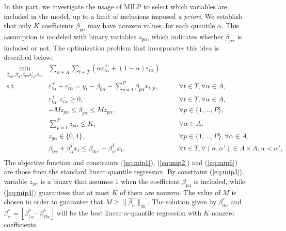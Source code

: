 In this part, we investigate the usage of MILP to select which variables are included in the model, up to a limit of inclusions imposed \textit{a priori}. We establish that only $K$ coefficients $\beta_{p\alpha}$ may have nonzero values, for each quantile $\alpha$. 
This assumption is modeled with binary variables $z_{p\alpha}$, which indicates whether $\beta_{p\alpha}$ is included or not.
The optimization problem that incorporates this idea is described below:
\begin{eqnarray}
 \underset{\beta_{0\alpha},\beta_\alpha,z_{p \alpha} \varepsilon_{t \alpha}^{+},\varepsilon_{t \alpha}^{-}}{\text{min}} & \sum_{\alpha \in A} \sum_{t\in T}\left(\alpha\varepsilon_{t \alpha}^{+}+(1-\alpha)\varepsilon_{t\alpha}^{-}\right) \label{eq:mip0} \\
\mbox{s.t } & \varepsilon_{t \alpha}^{+}-\varepsilon_{t \alpha}^{-}=y_{t}-\beta_{0 \alpha}-\sum_{p=1}^{P}\beta_{p \alpha}x_{t,p},& \qquad\forall t \in T ,\forall \alpha \in A, \label{eq:mip1}\\
& \varepsilon_{t \alpha}^{+},\varepsilon_{t \alpha}^{-}\geq0,&\qquad\forall t \in T ,\forall \alpha \in A, \label{eq:mip2}\\
& - M z_{p \alpha} \leq \beta_{p \alpha} \leq M z_{p \alpha},&\qquad\forall p\in\{1,\dots,P\}, \label{eq:mip3}\\
& \sum_{p=1}^P z_{p \alpha} \leq K, & \qquad \forall \alpha \in A, \label{eq:mip4}\\
& z_{p \alpha} \in \{0,1\},&\qquad\forall p\in\{1,\dots,P\}, \forall \alpha \in A, \label{eq:mip5}\\
& \beta_{0\alpha} + \beta_{\alpha}^T x_{t} \leq \beta_{0\alpha'} + \beta_{\alpha'}^T x_{t}, & \qquad \forall t \in T, \forall (\alpha, \alpha') \in A \times A,  \alpha < \alpha',\nonumber\\ \label{eq:mip6}
\end{eqnarray}
The objective function and constraints (\ref{eq:mip1}), (\ref{eq:mip2}) and (\ref{eq:mip6}) are those from the standard linear quantile regression. 
By constraint (\ref{eq:mip3}), variable $z_{p \alpha}$ is a binary that assumes 1 when the coefficient $\beta_{p \alpha}$ is included, while (\ref{eq:mip4}) guarantees that at most $K$ of them are nonzero.
The value of $M$ is chosen in order to guarantee that $M \geq \|\hat{\beta_\alpha}\|_{\infty}$. The solution given by $\beta_{0\alpha}^*$ and $\beta_\alpha^* = [ \beta_{1 \alpha}^* \cdots \beta_{P\alpha}^* ]$ will be the best linear $\alpha$-quantile regression with $K$ nonzero coefficients. 

